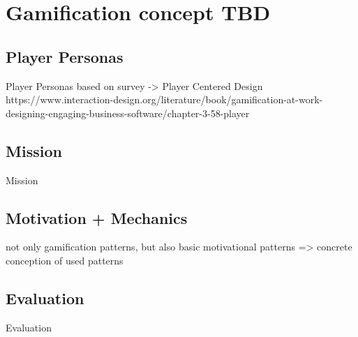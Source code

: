 
\section{Gamification concept TBD}
\label{sec:domainC}

\subsection{Player Personas}
\label{sec:domainCa}
Player Personas based on survey -> Player Centered Design
https://www.interaction-design.org/literature/book/gamification-at-work-designing-engaging-business-software/chapter-3-58-player

\subsection{Mission}
\label{sec:domainCb}
Mission

\subsection{Motivation + Mechanics}
\label{sec:domainCc}
not only gamification patterns, but also basic motivational patterns => concrete conception of used patterns

\subsection{Evaluation}
\label{sec:domainCd}
Evaluation
